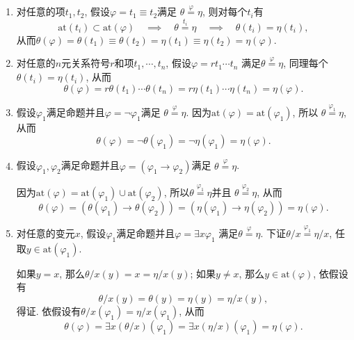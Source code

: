 \documentclass[UTF8]{ctexart}
\begin{document}
\begin{enumerate}
    \item 对任意的项$t_1,t_2$, 假设$\varphi=t_1\equiv t_2$满足
    $\theta\overset{\displaystyle\varphi}{=}\eta$, 则对每个$t_i$有
    \[
        \mathrm{at}(t_i)\subset\mathrm{at}(\varphi)\quad\implies\quad
        \theta\overset{\displaystyle t_i}{=}\eta\quad\implies\quad
        \theta(t_i)=\eta(t_i),
    \]
    从而$\theta(\varphi)=\theta(t_1)\equiv\theta(t_2)=
    \eta(t_1)\equiv\eta(t_2)=\eta(\varphi)$.

    \item 对任意的$n$元关系符号$r$和项$t_1,\cdots,t_n$, 假设$\varphi=rt_1\cdots t_n$
    满足$\theta\overset{\displaystyle\varphi}{=}\eta$,
    同理每个$\theta(t_i)=\eta(t_i)$, 从而
    \[
        \theta(\varphi)=r\theta(t_1)\cdots\theta(t_n)=
        r\eta(t_1)\cdots\eta(t_n)=\eta(\varphi).
    \]

    \item 假设$\varphi_1$满足命题并且$\varphi=\neg\varphi_1$满足
    $\theta\overset{\displaystyle\varphi}{=}\eta$.
    因为$\mathrm{at}(\varphi)=\mathrm{at}(\varphi_1)$, 所以
    $\theta\overset{\displaystyle\varphi_1}{=}\eta$, 从而
    \[
        \theta(\varphi)=\neg\theta(\varphi_1)=\neg\eta(\varphi_1)=\eta(\varphi).
    \]

    \item 假设$\varphi_1,\varphi_2$满足命题并且$\varphi=(\varphi_1\to\varphi_2)$满足
    $\theta\overset{\displaystyle\varphi}{=}\eta$.

    \hspace{2.17em}
    因为$\mathrm{at}(\varphi)=\mathrm{at}(\varphi_1)\cup\mathrm{at}(\varphi_2)$,
    所以$\theta\overset{\displaystyle\varphi_1}{=}\eta$并且
    $\theta\overset{\displaystyle\varphi_2}{=}\eta$, 从而
    \[
        \theta(\varphi)=(\theta(\varphi_1)\to\theta(\varphi_2))=
        (\eta(\varphi_1)\to\eta(\varphi_2))=\eta(\varphi).
    \]

    \item 对任意的变元$x$, 假设$\varphi_1$满足命题并且$\varphi=\exists x\varphi_1$
    满足$\theta\overset{\displaystyle\varphi}{=}\eta$.
    下证$\theta/x\overset{\displaystyle\varphi_1}{=}\eta/x$,
    任取$y\in\mathrm{at}(\varphi_1)$.

    \hspace{2.17em}
    如果$y=x$, 那么$\theta/x(y)=x=\eta/x(y)$; 如果$y\neq x$,
    那么$y\in\mathrm{at}(\varphi)$, 依假设有
    \[
        \theta/x(y)=\theta(y)=\eta(y)=\eta/x(y),
    \]
    得证. 依假设有$\theta/x(\varphi_1)=\eta/x(\varphi_1)$, 从而
    \begin{equation*}
        \theta(\varphi)=\exists x(\theta/x)(\varphi_1)=
        \exists x(\eta/x)(\varphi_1)=\eta(\varphi).
    \tag*{\qedsymbol}\end{equation*}
\end{enumerate}
\end{document}
